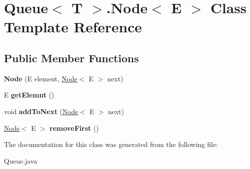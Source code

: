 \hypertarget{class_queue_1_1_node}{}\section{Queue$<$ T $>$.Node$<$ E $>$ Class Template Reference}
\label{class_queue_1_1_node}
\subsection*{Public Member Functions}
\begin{DoxyCompactItemize}
\item 
\hypertarget{class_queue_1_1_node_a82d02fc468f7f2ef4754447db0df9ad7}{}{\bfseries Node} (E element, \hyperlink{class_queue_1_1_node}{Node}$<$ E $>$ next)\label{class_queue_1_1_node_a82d02fc468f7f2ef4754447db0df9ad7}

\item 
\hypertarget{class_queue_1_1_node_a11ca7d0dacd155fb4f8041c0e9dcf67f}{}E {\bfseries get\+Elemnt} ()\label{class_queue_1_1_node_a11ca7d0dacd155fb4f8041c0e9dcf67f}

\item 
\hypertarget{class_queue_1_1_node_af0736824f34e172c012492fde25e0ab1}{}void {\bfseries add\+To\+Next} (\hyperlink{class_queue_1_1_node}{Node}$<$ E $>$ next)\label{class_queue_1_1_node_af0736824f34e172c012492fde25e0ab1}

\item 
\hypertarget{class_queue_1_1_node_aee1267e31e011085764bdcabe99a7605}{}\hyperlink{class_queue_1_1_node}{Node}$<$ E $>$ {\bfseries remove\+First} ()\label{class_queue_1_1_node_aee1267e31e011085764bdcabe99a7605}

\end{DoxyCompactItemize}


The documentation for this class was generated from the following file\+:\begin{DoxyCompactItemize}
\item 
Queue.\+java\end{DoxyCompactItemize}
